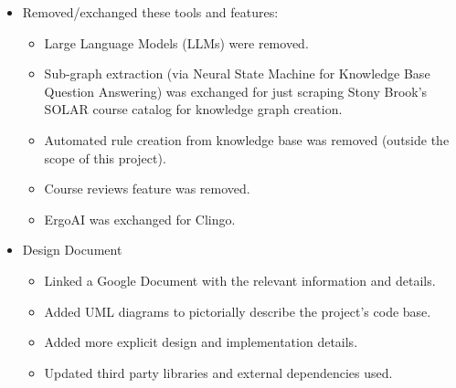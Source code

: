 \documentclass[12pt]{article}
\begin{document}

    \begin{itemize}
        \item Removed/exchanged these tools and features:
        \begin{itemize}
            \item Large Language Models (LLMs) were removed.
            \item Sub-graph extraction (via Neural State Machine for Knowledge Base Question Answering) was exchanged for just scraping Stony Brook's SOLAR course catalog for knowledge graph creation.
            \item Automated rule creation from knowledge base was removed (outside the scope of this project).
            \item Course reviews feature was removed.
            \item ErgoAI was exchanged for Clingo.
        \end{itemize}
        \item Design Document
        \begin{itemize}
            \item Linked a Google Document with the relevant information and details.
            \item Added UML diagrams to pictorially describe the project's code base.
            \item Added more explicit design and implementation details.
            \item Updated third party libraries and external dependencies used.
        \end{itemize}
    \end{itemize}
\end{document}
